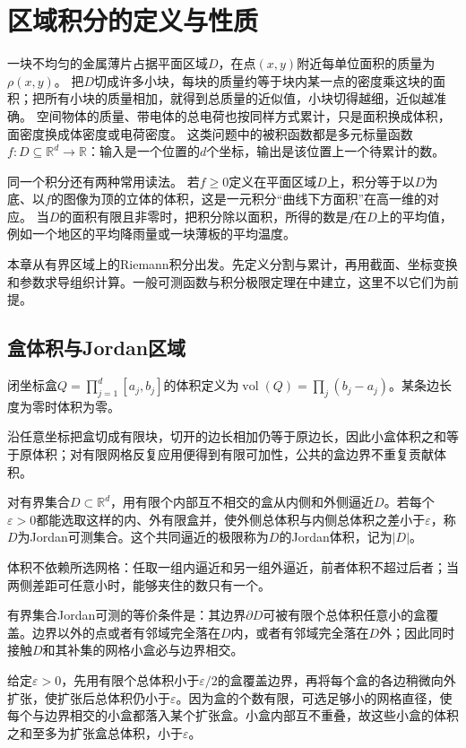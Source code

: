 \section{区域积分的定义与性质}
\label{sec:multivariable-region-integration}

一块不均匀的金属薄片占据平面区域$D$，在点$(x,y)$附近每单位面积的质量为$\rho(x,y)$。
把$D$切成许多小块，每块的质量约等于块内某一点的密度乘这块的面积；把所有小块的质量相加，就得到总质量的近似值，小块切得越细，近似越准确。
空间物体的质量、带电体的总电荷也按同样方式累计，只是面积换成体积，面密度换成体密度或电荷密度。
这类问题中的被积函数都是多元标量函数$f:D\subseteq\mathbb R^d\to\mathbb R$：输入是一个位置的$d$个坐标，输出是该位置上一个待累计的数。

同一个积分还有两种常用读法。
若$f\geq0$定义在平面区域$D$上，积分等于以$D$为底、以$f$的图像为顶的立体的体积，这是一元积分“曲线下方面积”在高一维的对应。
当$D$的面积有限且非零时，把积分除以面积，所得的数是$f$在$D$上的平均值，例如一个地区的平均降雨量或一块薄板的平均温度。

本章从有界区域上的Riemann积分出发。先定义分割与累计，再用截面、坐标变换和参数求导组织计算。一般可测函数与积分极限定理在中建立，这里不以它们为前提。

\subsection{盒体积与Jordan区域}

闭坐标盒$Q=\prod_{j=1}^d[a_j,b_j]$的体积定义为$\operatorname{vol}(Q)=\prod_j(b_j-a_j)$。某条边长度为零时体积为零。

沿任意坐标把盒切成有限块，切开的边长相加仍等于原边长，因此小盒体积之和等于原体积；对有限网格反复应用便得到有限可加性，公共的盒边界不重复贡献体积。

对有界集合$D\subset\mathbb R^d$，用有限个内部互不相交的盒从内侧和外侧逼近$D$。若每个$\varepsilon>0$都能选取这样的内、外有限盒并，使外侧总体积与内侧总体积之差小于$\varepsilon$，称$D$为Jordan可测集合。这个共同逼近的极限称为$D$的Jordan体积，记为$|D|$。

体积不依赖所选网格：任取一组内逼近和另一组外逼近，前者体积不超过后者；当两侧差距可任意小时，能够夹住的数只有一个。

有界集合Jordan可测的等价条件是：其边界$\partial D$可被有限个总体积任意小的盒覆盖。边界以外的点或者有邻域完全落在$D$内，或者有邻域完全落在$D$外；因此同时接触$D$和其补集的网格小盒必与边界相交。

给定$\varepsilon>0$，先用有限个总体积小于$\varepsilon/2$的盒覆盖边界，再将每个盒的各边稍微向外扩张，使扩张后总体积仍小于$\varepsilon$。因为盒的个数有限，可选足够小的网格直径，使每个与边界相交的小盒都落入某个扩张盒。小盒内部互不重叠，故这些小盒的体积之和至多为扩张盒总体积，小于$\varepsilon$。

